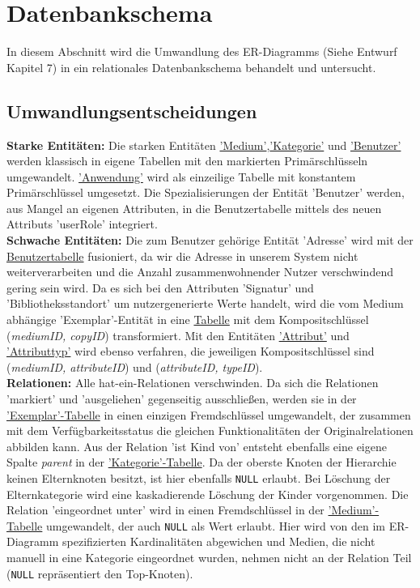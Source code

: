 \documentclass{article}
\begin{document}
\section{Datenbankschema}
In diesem Abschnitt wird die Umwandlung des ER-Diagramms (Siehe Entwurf Kapitel 7) in ein relationales Datenbankschema behandelt und untersucht.
\subsection{Umwandlungsentscheidungen}
\textbf{Starke Entitäten:} Die starken Entitäten \hyperlink{Medium}{'Medium'},\hyperlink{Category}{'Kategorie'} und \hyperlink{User}{'Benutzer'} werden klassisch in eigene Tabellen mit den markierten Primärschlüsseln umgewandelt. \hyperlink{Application}{'Anwendung'} wird als einzeilige Tabelle mit konstantem Primärschlüssel umgesetzt. Die Spezialisierungen der Entität 'Benutzer' werden, aus Mangel an eigenen Attributen, in die Benutzertabelle mittels des neuen Attributs 'userRole' integriert. \\
\textbf{Schwache Entitäten:} Die zum Benutzer gehörige Entität 'Adresse' wird mit der \hyperlink{User}{Benutzertabelle} fusioniert, da wir die Adresse in unserem System nicht weiterverarbeiten und die Anzahl zusammenwohnender Nutzer verschwindend gering sein wird. Da es sich bei den Attributen 'Signatur' und 'Bibliotheksstandort' um nutzergenerierte Werte handelt, wird die vom Medium abhängige 'Exemplar'-Entität in eine \hyperlink{Copy}{Tabelle} mit dem Kompositschlüssel (\textit{mediumID, copyID}) transformiert. Mit den Entitäten \hyperlink{CustomAttribute}{'Attribut'} und \hyperlink{AttributeType}{'Attributtyp'} wird ebenso verfahren, die jeweiligen Kompositschlüssel sind (\textit{mediumID, attributeID}) und (\textit{attributeID, typeID}). \\
\textbf{Relationen:} Alle hat-ein-Relationen verschwinden. Da sich die Relationen 'markiert' und 'ausgeliehen' gegenseitig ausschließen, werden sie in der \hyperlink{Copy}{'Exemplar'-Tabelle} in einen einzigen Fremdschlüssel umgewandelt, der zusammen mit dem Verfügbarkeitsstatus die gleichen Funktionalitäten der Originalrelationen abbilden kann. Aus der Relation 'ist Kind von' entsteht ebenfalls eine eigene Spalte \textit{parent} in der \hyperlink{Category}{'Kategorie'-Tabelle}. Da der oberste Knoten der Hierarchie keinen Elternknoten besitzt, ist hier ebenfalls \texttt{NULL} erlaubt. Bei Löschung der Elternkategorie wird eine kaskadierende Löschung der Kinder vorgenommen. Die Relation 'eingeordnet unter' wird in einen Fremdschlüssel in der \hyperlink{Medium}{'Medium'-Tabelle} umgewandelt, der auch \texttt{NULL} als Wert erlaubt. Hier wird von den im ER-Diagramm spezifizierten Kardinalitäten abgewichen und Medien, die nicht manuell in eine Kategorie eingeordnet wurden, nehmen nicht an der Relation Teil (\texttt{NULL} repräsentiert den Top-Knoten). \\
\end{document}
